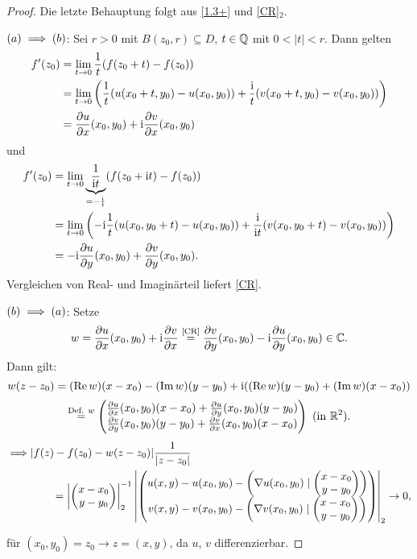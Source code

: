 \documentclass[a4paper,twoside,DIV15,BCOR12mm]{scrbook}
\begin{document}
\begin{proof} Die letzte Behauptung folgt aus \eqref{1.3+} und \eqref{CR}$_2$.

\noindent $(a) \implies (b)$: Sei $r > 0$ mit $B(z_0,r) \subseteq D$, $t\in\mathbb{Q}$ mit $0 < |t| < r$. Dann gelten
\begin{align}
f^\prime(z_0) &= \lim_{t\rightarrow 0} \frac{1}{t} (f(z_0+t) - f(z_0))\nonumber\\
&=  \lim_{t\rightarrow 0} \left(\frac{1}{t} (u(x_0+t,y_0)-u(x_0,y_0)) + \frac{\mathrm{i}}{t} (v(x_0+t,y_0)-v(x_0,y_0))\right)\nonumber\\
&=\frac{\partial u}{\partial x} (x_0,y_0) + \mathrm{i}\frac{\partial v}{\partial x} (x_0,y_0)
\end{align} und \begin{align}
f^\prime(z_0) &= \lim_{t\rightarrow 0} \underbrace{\frac{1}{\mathrm{i} t}}_{=-\frac{\mathrm{i}}{t}} (f(z_0+\mathrm{i} t) - f(z_0))\nonumber\\
&=  \lim_{t\rightarrow 0} \left(-\mathrm{i}\frac{1}{t} (u(x_0,y_0+t)-u(x_0,y_0)) + \frac{\mathrm{i}}{\mathrm{i} t} (v(x_0,y_0+t)-v(x_0,y_0))\right)\nonumber\\
&=-\mathrm{i}\frac{\partial u}{\partial y} (x_0,y_0) + \frac{\partial v}{\partial y} (x_0,y_0).
\end{align}
Vergleichen von Real- und Imaginärteil liefert \eqref{CR}.

\noindent $(b) \implies (a)$: Setze
\[w=\frac{\partial u}{\partial x} (x_0,y_0) + \mathrm{i}\frac{\partial v}{\partial x}\stackrel{\text{\eqref{CR}}}{=} \frac{\partial v}{\partial y} (x_0,y_0) - \mathrm{i}\frac{\partial u}{\partial y}(x_0,y_0) \in\mathbb{C}.\]
Dann gilt:
\[w(z-z_0) = (\operatorname{Re}{w})(x-x_0) - (\operatorname{Im}{w})(y-y_0) + \mathrm{i}((\operatorname{Re}{w})(y-y_0) + (\operatorname{Im}{w})(x-x_0))\]
\[\stackrel{\text{Def. $w$}}{=} \cmplx{\frac{\partial u}{\partial x} (x_0,y_0)(x-x_0) + \frac{\partial u}{\partial y}(x_0,y_0)(y-y_0)}{\frac{\partial v}{\partial y} (x_0,y_0)(y-y_0) + \frac{\partial v}{\partial x}(x_0,y_0)(x-x_0)}\ \text{(in $\R^2$)}.\]
\begin{align*}
\displaystyle\folgt &|f(z)-f(z_0)-w(z-z_0)|\frac{1}{|z-z_0|}\\
&\qquad= \left|\cmplx{x-x_0}{y-y_0}\right|_2^{-1} \left|\cmplx{u(x,y)-u(x_0,y_0)-\left(\nabla u(x_0,y_0)\mid\cmplx{x-x_0}{y-y_0}\right)}{v(x,y)-v(x_0,y_0)-\left(\nabla v(x_0,y_0)\mid\cmplx{x-x_0}{y-y_0}\right)}\right|_2 \ra 0,
\end{align*}

für $(x_0,y_0)=z_0 \to z=(x,y)$,
da $u$, $v$ differenzierbar.
\end{proof}
\end{document}
